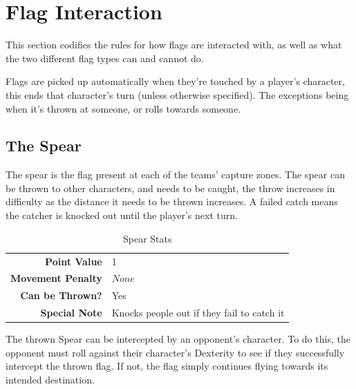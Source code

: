 \section{Flag Interaction} \label{flag-interaction}
This section codifies the rules for how flags are interacted with, as well as what the two different flag types can and cannot do.

Flags are picked up automatically when they're touched by a player's character, this ends that character's turn (unless otherwise specified).
The exceptions being when it's thrown at someone, or rolls towards someone.

\subsection{The Spear}
The spear is the flag present at each of the teams' capture zones.
The spear can be thrown to other characters, and needs to be caught, the throw increases in difficulty as the distance it needs to be thrown increases. 
A failed catch means the catcher is knocked out until the player's next turn.

\begin{table}[!h]
    \centering
\begin{tabular}{r|l}
    \textbf{Point Value} & 1 \\
    \textbf{Movement Penalty} & $None$ \\
    \textbf{Can be Thrown?} & Yes \\
    \textbf{Special Note} & Knocks people out if they fail to catch it \\
\end{tabular} 
    \caption{Spear Stats}
    \label{tab:spear}
\end{table}
The thrown Spear can be intercepted by an opponent's character. 
To do this, the opponent must roll against their character's Dexterity to see if they successfully intercept the thrown flag. If not, the flag simply continues flying towards its intended destination.

